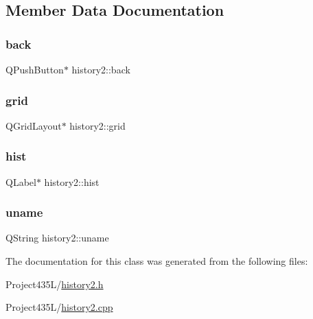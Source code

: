 \subsection{Member Data Documentation}
\mbox{\label{classhistory2_a0470bbf998bbce52a6e796b074d468e4}} 
\subsubsection{\texorpdfstring{back}{back}}
{\footnotesize\ttfamily Q\+Push\+Button$\ast$ history2\+::back\hspace{0.3cm}{\ttfamily [private]}}

\mbox{\label{classhistory2_aa5e784862787ed57ab8fb579c4b15e49}} 
\subsubsection{\texorpdfstring{grid}{grid}}
{\footnotesize\ttfamily Q\+Grid\+Layout$\ast$ history2\+::grid\hspace{0.3cm}{\ttfamily [private]}}

\mbox{\label{classhistory2_af66bf8350aae615ff0c3bf0b3b488dc3}} 
\subsubsection{\texorpdfstring{hist}{hist}}
{\footnotesize\ttfamily Q\+Label$\ast$ history2\+::hist\hspace{0.3cm}{\ttfamily [private]}}

\mbox{\label{classhistory2_a4cd050b461e20f2a67a4701840f38168}} 
\subsubsection{\texorpdfstring{uname}{uname}}
{\footnotesize\ttfamily Q\+String history2\+::uname\hspace{0.3cm}{\ttfamily [private]}}



The documentation for this class was generated from the following files\+:\begin{DoxyCompactItemize}
\item 
Project435\+L/\hyperlink{history2_8h}{history2.\+h}\item 
Project435\+L/\hyperlink{history2_8cpp}{history2.\+cpp}\end{DoxyCompactItemize}
